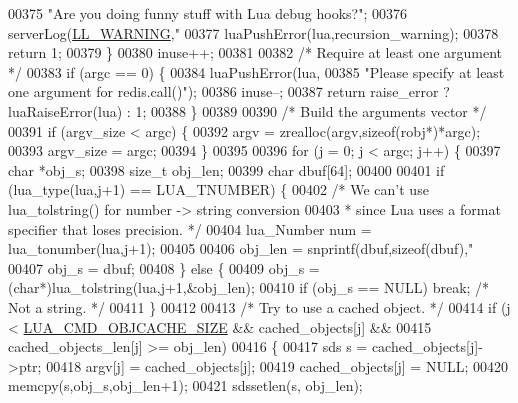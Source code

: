 \begin{DoxyCode}
{{{{00375             \textcolor{stringliteral}{"Are you doing funny stuff with Lua debug hooks?"};
00376         serverLog(\hyperlink{server_8h_a31229b9334bba7d6be2a72970967a14b}{LL\_WARNING},\textcolor{stringliteral}{"%
00377         luaPushError(lua,recursion\_warning);
00378         \textcolor{keywordflow}{return} 1;
00379     \}
00380     inuse++;
00381 
00382     \textcolor{comment}{/* Require at least one argument */}
00383     \textcolor{keywordflow}{if} (argc == 0) \{
00384         luaPushError(lua,
00385             \textcolor{stringliteral}{"Please specify at least one argument for redis.call()"});
00386         inuse--;
00387         \textcolor{keywordflow}{return} raise\_error ? luaRaiseError(lua) : 1;
00388     \}
00389 
00390     \textcolor{comment}{/* Build the arguments vector */}
00391     \textcolor{keywordflow}{if} (argv\_size < argc) \{
00392         argv = zrealloc(argv,\textcolor{keyword}{sizeof}(robj*)*argc);
00393         argv\_size = argc;
00394     \}
00395 
00396     \textcolor{keywordflow}{for} (j = 0; j < argc; j++) \{
00397         \textcolor{keywordtype}{char} *obj\_s;
00398         size\_t obj\_len;
00399         \textcolor{keywordtype}{char} dbuf[64];
00400 
00401         \textcolor{keywordflow}{if} (lua\_type(lua,j+1) == LUA\_TNUMBER) \{
00402             \textcolor{comment}{/* We can't use lua\_tolstring() for number -> string conversion}
00403 \textcolor{comment}{             * since Lua uses a format specifier that loses precision. */}
00404             lua\_Number num = lua\_tonumber(lua,j+1);
00405 
00406             obj\_len = snprintf(dbuf,\textcolor{keyword}{sizeof}(dbuf),\textcolor{stringliteral}{"%
00407             obj\_s = dbuf;
00408         \} \textcolor{keywordflow}{else} \{
00409             obj\_s = (\textcolor{keywordtype}{char}*)lua\_tolstring(lua,j+1,&obj\_len);
00410             \textcolor{keywordflow}{if} (obj\_s == NULL) \textcolor{keywordflow}{break}; \textcolor{comment}{/* Not a string. */}
00411         \}
00412 
00413         \textcolor{comment}{/* Try to use a cached object. */}
00414         \textcolor{keywordflow}{if} (j < \hyperlink{scripting_8c_a850a6381c0da4c20a2a6bfdd1cd179b4}{LUA\_CMD\_OBJCACHE\_SIZE} && cached\_objects[j] &&
00415             cached\_objects\_len[j] >= obj\_len)
00416         \{
00417             sds s = cached\_objects[j]->ptr;
00418             argv[j] = cached\_objects[j];
00419             cached\_objects[j] = NULL;
00420             memcpy(s,obj\_s,obj\_len+1);
00421             sdssetlen(s, obj\_len);
}}}}}}
\end{DoxyCode}
